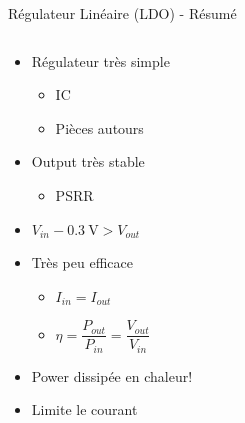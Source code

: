\begin{frame}{Régulateur Linéaire (LDO) - Résumé}
    \begin{columns}
        \begin{column}{0.5\textwidth}
            \vspace{-24pt}
            \begin{itemize}
                \item<1-> Régulateur très simple
                \begin{itemize}
                    \item<1-> IC
                    \item<1-> Pièces autours
                \end{itemize}
                \item<2-> Output très stable
                \begin{itemize}
                    \item<2-> PSRR
                \end{itemize}
                \item<3-> $V_{in} - \SI{0.3}{\volt} > V_{out}$
                \item<4-> Très peu efficace
                \begin{itemize}
                    \setlength{\itemsep}{4pt}
                    \item<4-> $I_{in} = I_{out}$
                    \item<4-> $\eta = \dfrac{P_{out}}{P_{in}} = \dfrac{V_{out}}{V_{in}}$
                \end{itemize}
                \item<5-> Power dissipée en chaleur!
                \item<5-> Limite le courant
            \end{itemize}
        \end{column}


\end{columns}
\end{frame}
